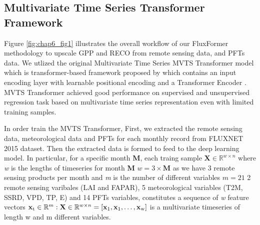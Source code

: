 \subsection{Multivariate Time Series Transformer Framework}
Figure \ref{fig:chap6_fig1} illustrates the overall workflow of our FluxFormer methodology to upscale GPP and RECO from remote sensing data, and PFTs data. We utlized the original Multivariate Time Series MVTS Transformer model which is transformer-based framework proposed by \citep{zerveas2021transformer} which contains an input encoding layer with learnable positional encoding and a Transformer Encoder \citep{vaswani2017attention}. MVTS Transformer achieved good performance on supervised and unsupervised regression task based on multivariate time series representation even with limited training samples.  \par
In order train the MVTS Transformer, First, we extracted the remote sensing data, meteorological data and PFTs for each monthly record from FLUXNET 2015 dataset. Then the extracted data is formed to feed to the deep learning model. In particular, for a specific month \textbf{M}, each traing sample $\mathbf{X} \in \mathbb{R}^{w\times n}$ where \textit{w} is the lengths of timeseries for month \textbf{M} $\textit{w} = 3\times \textbf{M}$ as we have 3 remote sensing products per month and \textit{m} is the number of different variables  $\textit{m} = 21$ 2 remote sensing varibales (LAI and FAPAR), 5 meteorological variables (T2M, SSRD, VPD, TP, E) and 14 PFTs variables, constitutes a sequence of \textit{w} feature vectors $\mathbf{x}\textsubscript{t} \in \mathbb{R}^{m}: \mathbf{X} \in \mathbb{R}^{w\times n} = [\mathbf{x}\textsubscript{1},\mathbf{x}\textsubscript{1}, \dots, \mathbf{x}\textsubscript{w}]$ is a multivariate timeseries of length w and m different variables. \par

